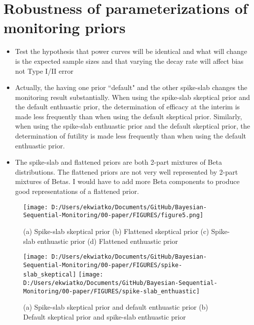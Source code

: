 \documentclass[12pt]{article}
\begin{document}
\section{Robustness of parameterizations of monitoring priors}
\begin{itemize}
\item Test the hypothesis that power curves will be identical and what will change is the expected sample sizes and that varying the decay rate will affect bias not Type I/II error
\item Actually, the having one prior ``default" and the other spike-slab changes the monitoring result substantially. When using the spike-slab skeptical prior and the default enthuastic prior, the determination of efficacy at the interim is made less frequently than when using the default skeptical prior. Similarly, when using the spike-slab enthuastic prior and the default skeptical prior, the determination of futility is made less frequently than when using the default enthuastic prior.
\item The spike-slab and flattened priors are both 2-part mixtures of Beta distributions. The flattened priors are not very well represented by 2-part mixtures of Betas. I would have to add more Beta components to produce good representations of a flattened prior.
\end{itemize}
\begin{figure}
\texttt{[image: D:/Users/ekwiatko/Documents/GitHub/Bayesian-Sequential-Monitoring/00-paper/FIGURES/figure5.png]}
 \caption{(a) Spike-slab skeptical prior (b) Flattened skeptical prior (c) Spike-slab enthuastic prior (d) Flattened enthuastic prior}
\end{figure}
\begin{figure}
\texttt{[image: D:/Users/ekwiatko/Documents/GitHub/Bayesian-Sequential-Monitoring/00-paper/FIGURES/spike-slab\_skeptical]}
\texttt{[image: D:/Users/ekwiatko/Documents/GitHub/Bayesian-Sequential-Monitoring/00-paper/FIGURES/spike-slab\_enthuastic]}
\caption{(a) Spike-slab skeptical prior and default enthuastic prior (b) Default skeptical prior and spike-slab enthuastic prior}
\end{figure}
\newpage




\end{document}
